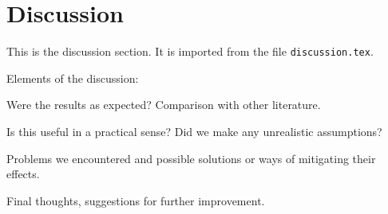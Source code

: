 \section{Discussion}
This is the discussion section.
It is imported from the file \verb+discussion.tex+.

Elements of the discussion:

Were the results as expected? Comparison with other literature.

Is this useful in a practical sense? Did we make any unrealistic assumptions?

Problems we encountered and possible solutions or ways of mitigating their effects.

Final thoughts, suggestions for further improvement.